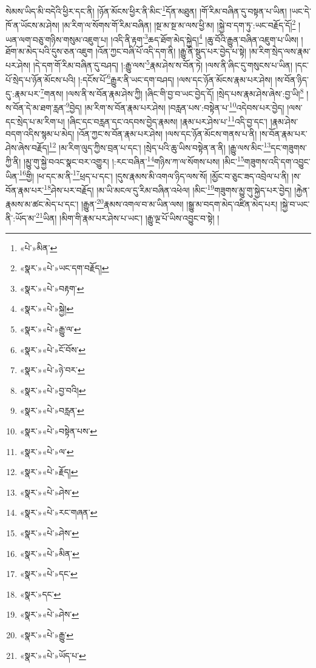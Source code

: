 སེམས་ཡིད་མི་བདེའི་ཕྱིར་དང་ནི། །ཉོན་མོངས་ཕྱིར་ནི་མིང་\footnote{«པེ་»མིན་}དོན་མཐུན། །གོ་རིམ་བཞིན་དུ་བསྟན་པ་ཡིན། །ཡང་དེ་ཁོ་ན་ཡོངས་མ་ཤེས། །མ་རིག་ལ་སོགས་གོ་རིམ་བཞིན། །སྔ་མ་སྔ་མ་ལས་ཕྱི་མ། །སྐྱེ་བ་དག་ཏུ་:ཡང་བརྗོད་དོ།\footnote{«སྣར་»«པེ་»ཡང་དག་བརྗོད།} །ཡན་ལག་བཅུ་གཉིས་གསུམ་འཇུག་པ། །འདི་ནི་རྟག་\footnote{«སྣར་»«པེ་»བརྟག་}ཆད་ཐོག་མེད་སྐྱེད།\footnote{«སྣར་»«པེ་»སྐྱེ།} །ཆུ་བོའི་རྒྱུན་བཞིན་འཇུག་པ་ཡིས། །ཐོག་མ་མེད་པའི་དུས་ཅན་འཇུག །འོན་ཀྱང་བཞི་པོ་འདི་དག་ནི། །རྒྱུ་ནི་སྡུད་པར་བྱེད་པ་སྟེ། །མ་རིག་སྲེད་ལས་རྣམ་པར་ཤེས། །དེ་དག་གོ་རིམ་བཞིན་དུ་བཤད། །:རྒྱུ་ལས་\footnote{«སྣར་»«པེ་»རྒྱུ་ལ་}རྣམ་ཤེས་ས་བོན་ཏེ། །ལས་ནི་ཞིང་དུ་གསུངས་པ་ཡིན། །དང་པོ་སྲེད་པ་ཉོན་མོངས་པའི། །:དངོས་པོ་\footnote{«སྣར་»«པེ་»ངོ་བོས་}རྒྱུར་ནི་ཡང་དག་བཤད། །ལས་དང་ཉོན་མོངས་རྣམ་པར་ཤེས། །ས་བོན་ཉིད་དུ་:རྣམ་པར་\footnote{«སྣར་»«པེ་»ཉེ་བར་}གནས། །ལས་ནི་ས་བོན་རྣམ་ཤེས་ཀྱི། །ཞིང་གི་བྱ་བ་ཡང་བྱེད་དོ། །སྲེད་པས་རྣམ་ཤེས་ཞེས་:བྱ་ཡི།\footnote{«སྣར་»«པེ་»བྱ་བའི།} །ས་བོན་དེ་མ་ཐག་རླན་\footnote{«སྣར་»«པེ་»བརླན་}བྱེད། །མ་རིག་ས་བོན་རྣམ་པར་ཤེས། །བརླན་པས་:བསྟེན་པ་\footnote{«སྣར་»«པེ་»བསྟེན་པས་}འདེབས་པར་བྱེད། །ལས་དང་སྲེད་པ་མ་རིག་པ། །ཞིང་དང་བརླན་དང་འདབས་བྱེད་རྣམས། །རྣམ་པར་ཤེས་པ་\footnote{«སྣར་»«པེ་»ལ་}འདི་བྱ་དང་། །རྣམ་ཤེས་བདག་འདིས་སྙམ་པ་མེད། །འོན་ཀྱང་ས་བོན་རྣམ་པར་ཤེས། །ལས་དང་ཉོན་མོངས་གནས་པ་ནི། །ས་བོན་རྣམ་པར་ཤེས་ཞེས་བརྗོད།\footnote{«སྣར་»«པེ་»རྗོད།} །མ་རིག་ལུད་ཀྱིས་བྲན་པ་དང་། །སྲེད་པའི་ཆུ་ཡིས་བསྟེན་ན་ནི། །རྒྱུ་ལས་མིང་\footnote{«སྣར་»«པེ་»ཤེས་}དང་གཟུགས་ཀྱི་ནི། །མྱུ་གུ་སྐྱེ་བའང་སྣང་བར་འགྱུར། །:རང་བཞིན་\footnote{«སྣར་»«པེ་»རང་གཞན་}གཉིས་ཀ་ལ་སོགས་པས། །མིང་\footnote{«སྣར་»«པེ་»ཤེས་}གཟུགས་འདི་དག་འབྱུང་ཡིན་\footnote{«སྣར་»«པེ་»མིན་}གྱི། །ཕ་དང་མ་ནི་\footnote{«སྣར་»«པེ་»དང་}ཕྲད་པ་དང་། །དུས་རྣམས་མི་འགལ་ཉིད་ལས་སོ། །མྱོང་བ་ཅུང་ཟད་འབྲེལ་པ་ནི། །ས་བོན་རྣམ་པར་\footnote{«སྣར་»དང་}ཤེས་པར་བརྗོད། །མ་ཡི་མངལ་དུ་རིམ་བཞིན་འཕེལ། །མིང་\footnote{«སྣར་»«པེ་»ཤེས་}གཟུགས་མྱུ་གུ་སྐྱེད་པར་བྱེད། །རྐྱེན་རྣམས་མ་ཚང་མེད་པ་དང་། །རྒྱུན་\footnote{«སྣར་»«པེ་»རྒྱུ་}རྣམས་འགལ་བ་མ་ཡིན་ལས། །སྒྱུ་མ་བདག་མེད་འཛིན་མེད་པར། །སྐྱེ་བ་ཡང་ནི་:ཡོད་མ་\footnote{«སྣར་»«པེ་»ཡོད་པ་}ཡིན། །མིག་གི་རྣམ་པར་ཤེས་པ་ཡང་། །རྒྱུ་ལྔ་པོ་ཡིས་འབྱུང་བ་སྟེ། །
